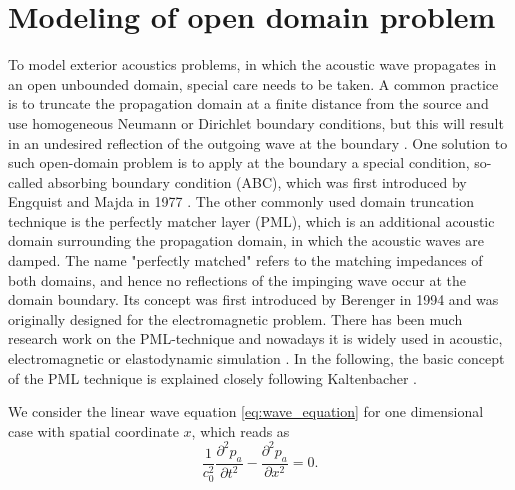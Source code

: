 \section{Modeling of open domain problem}

To model exterior acoustics problems, in which the acoustic wave propagates in an open unbounded domain, special care needs to be taken.
A common practice is to truncate the propagation domain at a finite distance from the source and use homogeneous Neumann or Dirichlet boundary conditions, but this will result in an undesired reflection of the outgoing wave at the boundary \cite{nataf_absorbing_2013, kaltenbacher_numerical_2007}. One solution to such open-domain problem is to apply at the boundary a special condition, so-called absorbing boundary condition (ABC), which was first introduced by Engquist and Majda in 1977 \cite{Engquist_ABC_1977}. The other commonly used domain truncation technique is the perfectly matcher layer (PML), which is an additional acoustic domain surrounding the propagation domain, in which the acoustic waves are damped. The name "perfectly matched" refers to the matching impedances of both domains, and hence no reflections of the impinging wave occur at the domain boundary. Its concept was first introduced by Berenger in 1994 \cite{BERENGER_PML_1994} and was originally designed for the electromagnetic problem. There has been much research work on the PML-technique \cite{kaltenbacher_numerical_2007} and nowadays it is widely used in acoustic, electromagnetic or elastodynamic simulation \cite{nataf_absorbing_2013}. In the following, the basic concept of the PML technique is explained closely following Kaltenbacher \cite{kaltenbacher_numerical_2007, KALTENBACHER_PML_2013}.

We consider the linear wave equation \cref{eq:wave_equation} for one dimensional case with spatial coordinate $x$, which reads as 
\begin{equation}
	\frac{1}{c_0^2}\frac{\partial^2 p_a}{\partial t^2} -	\frac{\partial^2 p_a}{\partial x^2} = 0\text{.} \label{eq:1d_wave_equation}
\end{equation}

